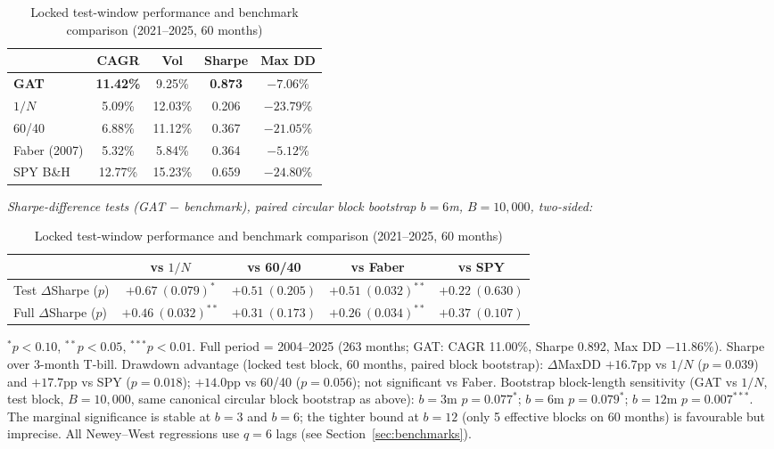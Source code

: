 \begin{table}[H]
\centering
\caption{Locked test-window performance and benchmark comparison (2021--2025, 60 months)}
\label{tab:oos}
\small
\begin{tabular}{lcccc}
\toprule
& CAGR & Vol & Sharpe & Max DD \\
\midrule
\textbf{GAT} & \textbf{11.42\%} & 9.25\%  & \textbf{0.873} & \textbf{$-7.06\%$} \\
$1/N$ \citep{demiguel2009} & 5.09\% & 12.03\% & 0.206 & $-23.79\%$ \\
60/40        & 6.88\%  & 11.12\% & 0.367 & $-21.05\%$ \\
Faber (2007) & 5.32\%  & 5.84\%  & 0.364 & $-5.12\%$ \\
SPY B\&H     & 12.77\% & 15.23\% & 0.659 & $-24.80\%$ \\
\bottomrule
\end{tabular}
\begin{flushleft}
\footnotesize
\textit{Sharpe-difference tests (GAT $-$ benchmark), paired circular block
bootstrap $b=6$m, $B=10{,}000$, two-sided:}
\smallskip

\begin{tabular}{lcccc}
\toprule
& vs $1/N$ & vs 60/40 & vs Faber & vs SPY \\
\midrule
Test $\Delta$Sharpe ($p$)  & $+0.67\ (0.079)^{*}$ & $+0.51\ (0.205)$ & $+0.51\ (0.032)^{**}$ & $+0.22\ (0.630)$ \\
Full $\Delta$Sharpe ($p$) & $+0.46\ (0.032)^{**}$ & $+0.31\ (0.173)$ & $+0.26\ (0.034)^{**}$ & $+0.37\ (0.107)$ \\
\bottomrule
\end{tabular}
\smallskip

$^{*}p<0.10$, $^{**}p<0.05$, $^{***}p<0.01$. Full period = 2004--2025 (263 months;
GAT: CAGR 11.00\%, Sharpe 0.892, Max DD $-11.86\%$). Sharpe over 3-month T-bill.
Drawdown advantage (locked test block, 60 months, paired block bootstrap):
$\Delta$MaxDD $+16.7$pp vs $1/N$ ($p=0.039$) and $+17.7$pp vs SPY ($p=0.018$);
$+14.0$pp vs 60/40 ($p=0.056$); not significant vs Faber.
Bootstrap block-length sensitivity (GAT vs $1/N$, test block, $B=10{,}000$,
same canonical circular block bootstrap as above):
$b=3$m $p=0.077^{*}$; $b=6$m $p=0.079^{*}$; $b=12$m $p=0.007^{***}$.
The marginal significance is stable at $b=3$ and $b=6$; the tighter bound at
$b=12$ (only 5 effective blocks on 60 months) is favourable but imprecise.
All Newey--West regressions use $q=6$ lags (see Section~\ref{sec:benchmarks}).
\end{flushleft}
\end{table}

